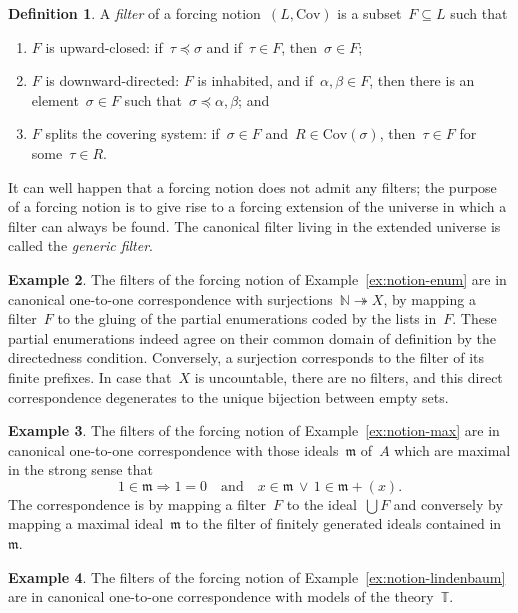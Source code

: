 \documentclass[com,11pt,crcready]{iosart2x}
\theoremstyle{definition}
\newtheorem{definition}{Definition}[section]
\newtheorem{example}[definition]{Example}
\theoremstyle{plain}
\theoremstyle{remark}
\newcommand{\mmm}{\mathfrak{m}}
\newcommand{\NN}{\mathbb{N}}
\newcommand{\TT}{\mathbb{T}}
\newcommand{\Cov}{\mathrm{Cov}}
\renewcommand{\_}{\mathpunct{.}\,}
\begin{document}
\begin{definition}A \emph{filter} of a forcing notion~$(L,\mathrm{Cov})$
is a subset~$F \subseteq L$ such that
\begin{enumerate}
\item $F$ is upward-closed: if~$\tau \preceq \sigma$ and if~$\tau \in F$,
then~$\sigma \in F$;
\item $F$ is downward-directed: $F$ is inhabited, and if~$\alpha,\beta \in F$,
then there is an element~$\sigma \in F$ such that~$\sigma \preceq
\alpha,\beta$; and
\item $F$ splits the covering system: if~$\sigma \in F$ and~$R \in
\Cov(\sigma)$, then~$\tau \in F$ for some~$\tau \in R$.
\end{enumerate}
\end{definition}

It can well happen that a forcing notion does not admit any filters; the
purpose of a forcing notion is to give rise to a forcing extension of the
universe in which a filter can always be found. The canonical filter living in
the extended universe is called the \emph{generic filter}.

\begin{example}The filters of the forcing notion of
Example~\ref{ex:notion-enum} are in canonical one-to-one correspondence with
surjections~$\NN \twoheadrightarrow X$, by mapping a filter~$F$ to the gluing
of the partial enumerations coded by the lists in~$F$. These partial
enumerations indeed agree on their common domain of definition by the
directedness condition. Conversely, a surjection corresponds to the filter of
its finite prefixes. In case that~$X$ is uncountable, there are no filters, and
this direct correspondence degenerates to the unique bijection between
empty sets.
\end{example}

\begin{example}The filters of the forcing notion of
Example~\ref{ex:notion-max} are in canonical one-to-one correspondence with
those ideals~$\mmm$ of~$A$ which are maximal in the strong sense that
\[
  1 \in \mmm \Longrightarrow 1 = 0
    \quad\text{and}\quad
  x \in \mmm \,\vee\, 1 \in \mmm + (x).
\]
The correspondence is by mapping a filter~$F$ to the ideal~$\bigcup F$
and conversely by mapping a maximal ideal~$\mmm$ to the filter of finitely
generated ideals contained in~$\mmm$.
\end{example}

\begin{example}The filters of the forcing notion of
Example~\ref{ex:notion-lindenbaum} are in canonical one-to-one correspondence with
models of the theory~$\TT$.
\end{example}
\end{document}
